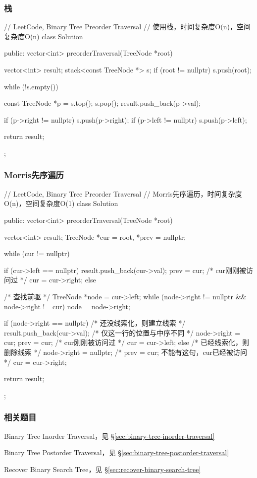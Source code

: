 \subsubsection{栈}
\begin{Code}
// LeetCode, Binary Tree Preorder Traversal
// 使用栈，时间复杂度O(n)，空间复杂度O(n)
class Solution {
public:
    vector<int> preorderTraversal(TreeNode *root) {
        vector<int> result;
        stack<const TreeNode *> s;
        if (root != nullptr) s.push(root);

        while (!s.empty()) {
            const TreeNode *p = s.top();
            s.pop();
            result.push_back(p->val);

            if (p->right != nullptr) s.push(p->right);
            if (p->left != nullptr) s.push(p->left);
        }
        return result;
    }
};
\end{Code}


\subsubsection{Morris先序遍历}
\begin{Code}
// LeetCode, Binary Tree Preorder Traversal
// Morris先序遍历，时间复杂度O(n)，空间复杂度O(1)
class Solution {
public:
    vector<int> preorderTraversal(TreeNode *root) {
        vector<int> result;
        TreeNode *cur = root, *prev = nullptr;

        while (cur != nullptr) {
            if (cur->left == nullptr) {
                result.push_back(cur->val);
                prev = cur; /* cur刚刚被访问过 */
                cur = cur->right;
            } else {
                /* 查找前驱 */
                TreeNode *node = cur->left;
                while (node->right != nullptr && node->right != cur)
                    node = node->right;

                if (node->right == nullptr) { /* 还没线索化，则建立线索 */
                    result.push_back(cur->val); /* 仅这一行的位置与中序不同 */
                    node->right = cur;
                    prev = cur; /* cur刚刚被访问过 */
                    cur = cur->left;
                } else {    /* 已经线索化，则删除线索  */
                    node->right = nullptr;
                    /* prev = cur; 不能有这句，cur已经被访问 */
                    cur = cur->right;
                }
            }
        }
        return result;
    }
};
\end{Code}


\subsubsection{相关题目}
\begindot
\item Binary Tree Inorder Traversal，见 \S \ref{sec:binary-tree-inorder-traversal}
\item Binary Tree Postorder Traversal，见 \S \ref{sec:binary-tree-postorder-traversal}
\item Recover Binary Search Tree，见 \S \ref{sec:recover-binary-search-tree}
\myenddot


